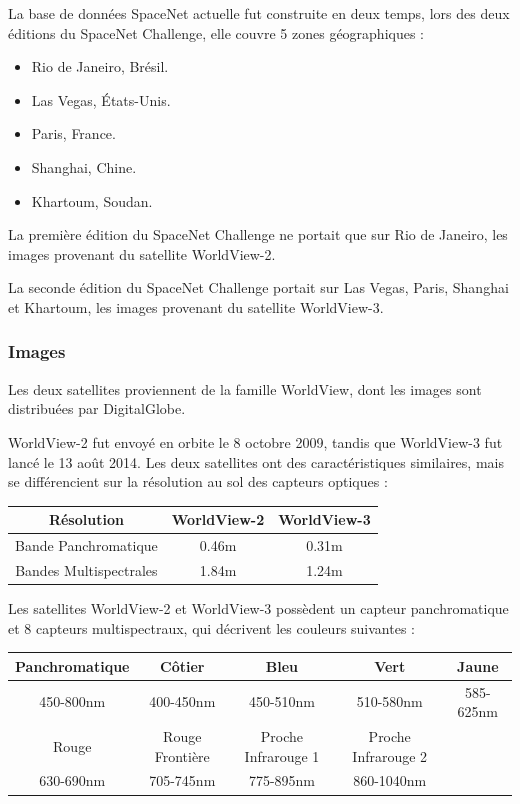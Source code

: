 \documentclass[a4paper, 11pt]{report}
\begin{document}
La base de données SpaceNet actuelle fut construite en deux temps, lors des deux éditions du SpaceNet Challenge, elle couvre 5 zones géographiques :
\begin{itemize}
	\item Rio de Janeiro, Brésil.
	\item Las Vegas, États-Unis.
	\item Paris, France.
	\item Shanghai, Chine.
	\item Khartoum, Soudan.
\end{itemize}

La première édition du SpaceNet Challenge ne portait que sur Rio de Janeiro, les images provenant du satellite WorldView-2.

La seconde édition du SpaceNet Challenge portait sur Las Vegas, Paris, Shanghai et Khartoum, les images provenant du satellite WorldView-3.

\subsubsection{Images}
Les deux satellites proviennent de la famille WorldView, dont les images sont distribuées par DigitalGlobe. 

WorldView-2 fut envoyé en orbite le 8 octobre 2009, tandis que WorldView-3 fut lancé le 13 août 2014.
Les deux satellites ont des caractéristiques similaires, mais se différencient sur la résolution au sol des capteurs optiques :
\begin{center}
	\begin{tabular}{|c|c|c|}
	\hline 
	Résolution & WorldView-2 & WorldView-3 \\ 
	\hline 
	Bande Panchromatique & 0.46m & 0.31m \\ 
	\hline 
	Bandes Multispectrales & 1.84m & 1.24m \\ 
	\hline
	\end{tabular}	
\end{center}

Les satellites WorldView-2 et WorldView-3 possèdent un capteur panchromatique et $8$ capteurs multispectraux, qui décrivent les couleurs suivantes :
\begin{center}
	\begin{tabular}{|c|c|c|c|c|}
	\hline 
	Panchromatique & Côtier & Bleu & Vert & Jaune \\ 
	\hline 
	450-800nm & 400-450nm & 450-510nm & 510-580nm & 585-625nm \\ 
	\hline 
	Rouge & Rouge Frontière & Proche Infrarouge 1 & Proche Infrarouge 2 & \\ 
	\hline 
	630-690nm & 705-745nm & 775-895nm & 860-1040nm & \\ 
	\hline 
	\end{tabular}
\end{center}
\end{document}
